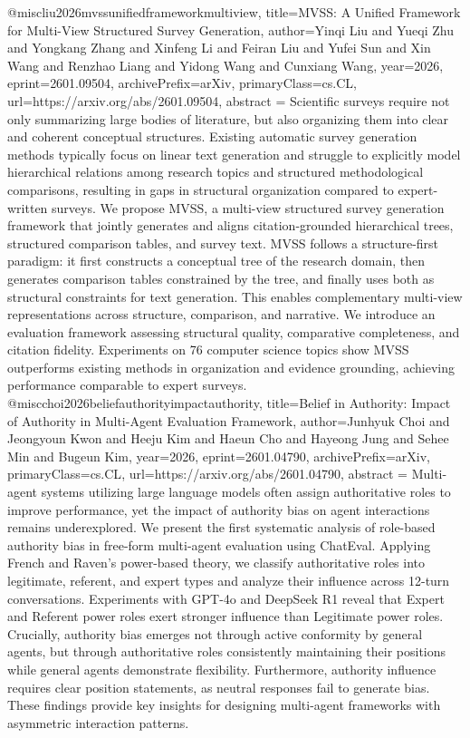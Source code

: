 {}@misc{liu2026mvssunifiedframeworkmultiview,
      title={MVSS: A Unified Framework for Multi-View Structured Survey Generation}, 
      author={Yinqi Liu and Yueqi Zhu and Yongkang Zhang and Xinfeng Li and Feiran Liu and Yufei Sun and Xin Wang and Renzhao Liang and Yidong Wang and Cunxiang Wang},
      year={2026},
      eprint={2601.09504},
      archivePrefix={arXiv},
      primaryClass={cs.CL},
      url={https://arxiv.org/abs/2601.09504},
      abstract = {Scientific surveys require not only summarizing large bodies of literature, but also organizing them into clear and coherent conceptual structures. Existing automatic survey generation methods typically focus on linear text generation and struggle to explicitly model hierarchical relations among research topics and structured methodological comparisons, resulting in gaps in structural organization compared to expert-written surveys. We propose MVSS, a multi-view structured survey generation framework that jointly generates and aligns citation-grounded hierarchical trees, structured comparison tables, and survey text. MVSS follows a structure-first paradigm: it first constructs a conceptual tree of the research domain, then generates comparison tables constrained by the tree, and finally uses both as structural constraints for text generation. This enables complementary multi-view representations across structure, comparison, and narrative. We introduce an evaluation framework assessing structural quality, comparative completeness, and citation fidelity. Experiments on 76 computer science topics show MVSS outperforms existing methods in organization and evidence grounding, achieving performance comparable to expert surveys.}
}@misc{choi2026beliefauthorityimpactauthority,
      title={Belief in Authority: Impact of Authority in Multi-Agent Evaluation Framework}, 
      author={Junhyuk Choi and Jeongyoun Kwon and Heeju Kim and Haeun Cho and Hayeong Jung and Sehee Min and Bugeun Kim},
      year={2026},
      eprint={2601.04790},
      archivePrefix={arXiv},
      primaryClass={cs.CL},
      url={https://arxiv.org/abs/2601.04790},
      abstract = {Multi-agent systems utilizing large language models often assign authoritative roles to improve performance, yet the impact of authority bias on agent interactions remains underexplored. We present the first systematic analysis of role-based authority bias in free-form multi-agent evaluation using ChatEval. Applying French and Raven's power-based theory, we classify authoritative roles into legitimate, referent, and expert types and analyze their influence across 12-turn conversations. Experiments with GPT-4o and DeepSeek R1 reveal that Expert and Referent power roles exert stronger influence than Legitimate power roles. Crucially, authority bias emerges not through active conformity by general agents, but through authoritative roles consistently maintaining their positions while general agents demonstrate flexibility. Furthermore, authority influence requires clear position statements, as neutral responses fail to generate bias. These findings provide key insights for designing multi-agent frameworks with asymmetric interaction patterns.}
}
